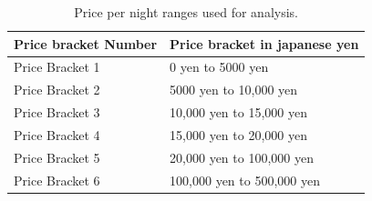 \documentclass[review]{elsarticle}
\begin{document}
\begin{table}[hbp] \centering
\caption{Price per night ranges used for analysis.}\label{tab:price_ranges}
\begin{tabular}{|l|l|}
\hline
\multicolumn{1}{|c|}{\textbf{Price bracket Number}} & \multicolumn{1}{c|}{\textbf{Price bracket in japanese yen}} \\ \hline
Price Bracket 1 & 0 yen to 5000 yen \\ \hline
Price Bracket 2 & 5000 yen to 10,000 yen \\ \hline
Price Bracket 3 & 10,000 yen to 15,000 yen \\ \hline
Price Bracket 4 & 15,000 yen to 20,000 yen \\ \hline
Price Bracket 5 & 20,000 yen to 100,000 yen \\ \hline
Price Bracket 6 & 100,000 yen to 500,000 yen \\ \hline
\end{tabular}
\end{table}
\end{document}
